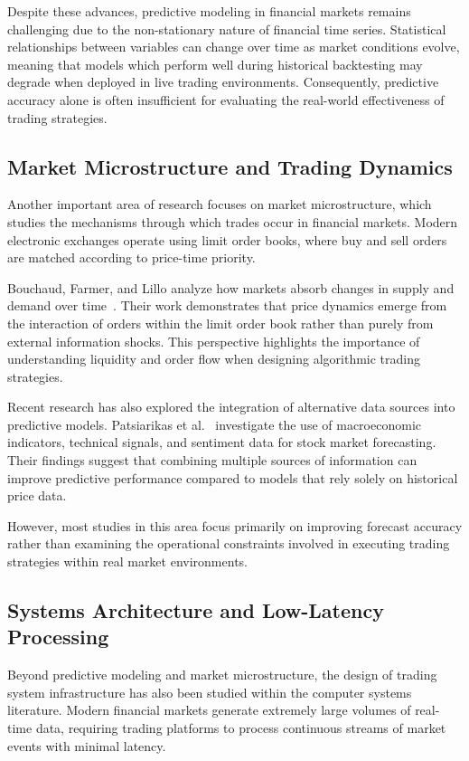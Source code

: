 \documentclass[12pt]{article}
\begin{document}
Despite these advances, predictive modeling in financial markets remains 
challenging due to the non-stationary nature of financial time series. 
Statistical relationships between variables can change over time as market 
conditions evolve, meaning that models which perform well during 
historical backtesting may degrade when deployed in live trading 
environments. Consequently, predictive accuracy alone is often 
insufficient for evaluating the real-world effectiveness of trading 
strategies.

\subsection{Market Microstructure and Trading Dynamics}

Another important area of research focuses on market microstructure, 
which studies the mechanisms through which trades occur in financial 
markets. Modern electronic exchanges operate using limit order books, 
where buy and sell orders are matched according to price-time priority.

Bouchaud, Farmer, and Lillo analyze how markets absorb changes in supply 
and demand over time~\cite{bouchaudTrades}. Their work demonstrates that 
price dynamics emerge from the interaction of orders within the limit 
order book rather than purely from external information shocks. This 
perspective highlights the importance of understanding liquidity and 
order flow when designing algorithmic trading strategies.

Recent research has also explored the integration of alternative data 
sources into predictive models. Patsiarikas et al.~\cite{patsiarikas2025macroeconomic} 
investigate the use of macroeconomic indicators, technical signals, 
and sentiment data for stock market forecasting. Their findings suggest 
that combining multiple sources of information can improve predictive 
performance compared to models that rely solely on historical price data.

However, most studies in this area focus primarily on improving forecast 
accuracy rather than examining the operational constraints involved in 
executing trading strategies within real market environments.

\subsection{Systems Architecture and Low-Latency Processing}

Beyond predictive modeling and market microstructure, the design of 
trading system infrastructure has also been studied within the computer 
systems literature. Modern financial markets generate extremely large 
volumes of real-time data, requiring trading platforms to process 
continuous streams of market events with minimal latency.
\end{document}
